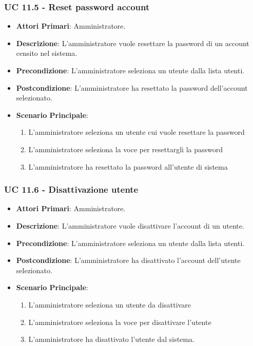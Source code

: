 			\subsubsection{UC 11.5 - Reset password account}
			\begin{itemize}
				\item \textbf{Attori Primari}: Amministratore.
				\item \textbf{Descrizione}: L'amministratore vuole resettare la password di un account censito nel sistema.
				\item \textbf{Precondizione}: L'amministratore seleziona un utente dalla lista utenti.
				\item \textbf{Postcondizione}: L'amministratore ha resettato la password dell'account selezionato.
				\item \textbf{Scenario Principale}:
				\begin{enumerate}
					\item{L'amministratore seleziona un utente cui vuole resettare la password}
					\item{L'amministratore seleziona la voce per resettargli la password}
					\item{L'amministratore ha resettato la password all'utente di sistema}
				\end{enumerate}		
			\end{itemize}

			
			\subsubsection{UC 11.6 - Disattivazione utente}
			\begin{itemize}
				\item \textbf{Attori Primari}: Amministratore.
				\item \textbf{Descrizione}: L'amministratore vuole disattivare l'account di un utente.
				\item \textbf{Precondizione}: L'amministratore seleziona un utente dalla lista utenti.
				\item \textbf{Postcondizione}: L'amministratore ha disattivato l'account dell'utente selezionato.
				\item \textbf{Scenario Principale}:
				\begin{enumerate}
					\item{L'amministratore seleziona un utente da disattivare}
					\item{L'amministratore seleziona la voce per disattivare l'utente}
					\item{L'amministratore ha disattivato l'utente dal sistema.}
				\end{enumerate}		
			\end{itemize}


